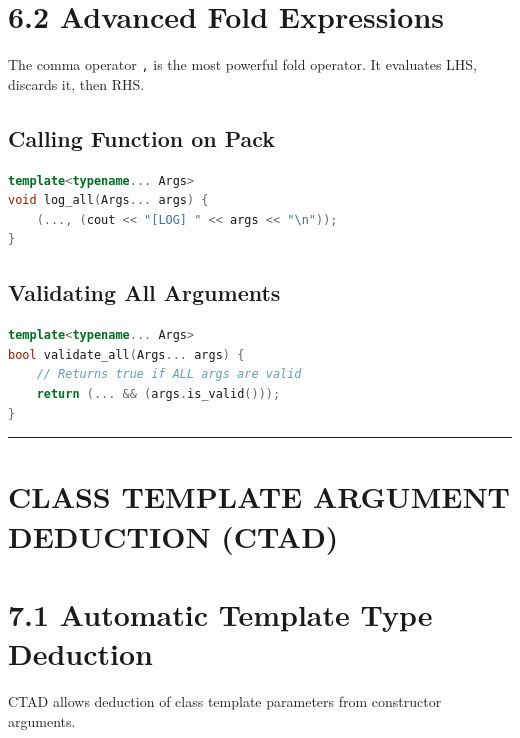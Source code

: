 \hypertarget{advanced-fold-expressions}{%
\section{6.2 Advanced Fold
Expressions}\label{advanced-fold-expressions}}

The comma operator \passthrough{\lstinline!,!} is the most powerful fold
operator. It evaluates LHS, discards it, then RHS.

\hypertarget{calling-function-on-pack}{%
\subsection{Calling Function on Pack}\label{calling-function-on-pack}}

\begin{lstlisting}[language={C++}]
template<typename... Args>
void log_all(Args... args) {
    (..., (cout << "[LOG] " << args << "\n")); 
}
\end{lstlisting}

\hypertarget{validating-all-arguments}{%
\subsection{Validating All Arguments}\label{validating-all-arguments}}

\begin{lstlisting}[language={C++}]
template<typename... Args>
bool validate_all(Args... args) {
    // Returns true if ALL args are valid
    return (... && (args.is_valid()));
}
\end{lstlisting}

\begin{center}\rule{0.5\linewidth}{0.5pt}\end{center}

\hypertarget{class-template-argument-deduction-ctad}{%
\section{CLASS TEMPLATE ARGUMENT DEDUCTION
(CTAD)}\label{class-template-argument-deduction-ctad}}

\hypertarget{automatic-template-type-deduction}{%
\section{7.1 Automatic Template Type
Deduction}\label{automatic-template-type-deduction}}

CTAD allows deduction of class template parameters from constructor
arguments.

